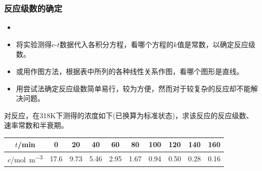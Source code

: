\documentclass[dvipsnames, svgnames, x11names]{beamer}
\begin{document}
    \begin{frame}
        \frametitle{反应级数的确定}
    
        \begin{itemize}
            \item[1.] 
        \end{itemize}
    \begin{itemize}
      \item 将实验测得$c$-$t$数据代入各积分方程，看哪个方程的$k$值是常数，以确定反应级数。
      \item 或用作图方法，根据表中所列的各种线性关系作图，看哪个图形是直线。
      \item 用尝试法确定反应级数简单易行，较为方便，然而对于较复杂的反应却不能解决问题。
    \end{itemize}
        
        \begin{example}
            对反应，在318K下测得的浓度如下(已换算为标准状态)，求该反应的反应级数、速率常数和半衰期。
            \begin{table}[]
                \begin{tabular}{cccccccccc}
                \hline
                $t$/min & 0 & 20 & 40 & 60 & 80 & 100 & 120 & 140 & 160 \\ \hline
                $c$/\si{mol.m^{-3}} & 17.6 & 9.73 & 5.46 & 2.95 & 1.67 & 0.94 & 0.50 & 0.28 & 0.16 \\ \hline
                \end{tabular}
                \end{table}
        \end{example}    
    
    \end{frame}
    
\end{document}

